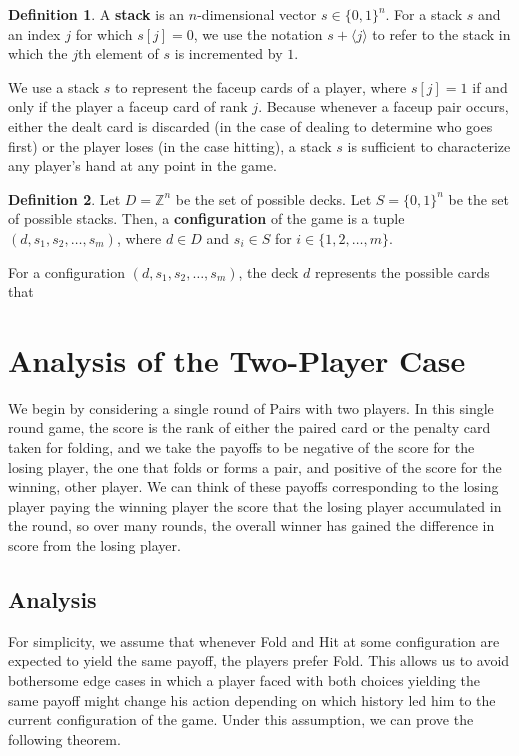 \documentclass{article}
\theoremstyle{definition}
\newtheorem{definition}{Definition}
\newcounter{a}
\begin{document}
\begin{definition}
A \textbf{stack} is an $n$-dimensional vector $s \in \{0,1\}^n$. For a stack $s$ and an index $j$ for which $s[j] = 0$, we use the notation $s+\langle j \rangle$ to refer to the stack in which the $j$th element of $s$ is incremented by $1$. 
\end{definition}

We use a stack $s$ to represent the faceup cards of a player, where $s[j] = 1$ if and only if the player a faceup card of rank $j$. Because whenever a faceup pair occurs, either the dealt card is discarded (in the case of dealing to determine who goes first) or the player loses (in the case hitting), a stack $s$ is sufficient to characterize any player's hand at any point in the game.

\begin{definition}
Let $D = \mathbb{Z}^n$ be the set of possible decks. Let $S = \{0,1\}^n$ be the set of possible stacks. Then, a \textbf{configuration} of the game is a tuple $(d,s_1,s_2,\dots,s_m)$, where $d \in D$ and $s_i \in S$ for $i \in \{1,2,\dots,m\}$.
\end{definition}

For a configuration $(d,s_1,s_2,\dots,s_m)$, the deck $d$ represents the possible cards that

\section{Analysis of the Two-Player Case}

We begin by considering a single round of Pairs with two players. In this single round game, the score is the rank of either the paired card or the penalty card taken for folding, and we take the payoffs to be negative of the score for the losing player, the one that folds or forms a pair, and positive of the score for the winning, other player. We can think of these payoffs corresponding to the losing player paying the winning player the score that the losing player accumulated in the round, so over many rounds, the overall winner has gained the difference in score from the losing player.

\subsection{Analysis}

For simplicity, we assume that whenever Fold and Hit at some configuration are expected to yield the same payoff, the players prefer Fold. This allows us to avoid bothersome edge cases in which a player faced with both choices yielding the same payoff might change his action depending on which history led him to the current configuration of the game. Under this assumption, we can prove the following theorem.
\end{document}
